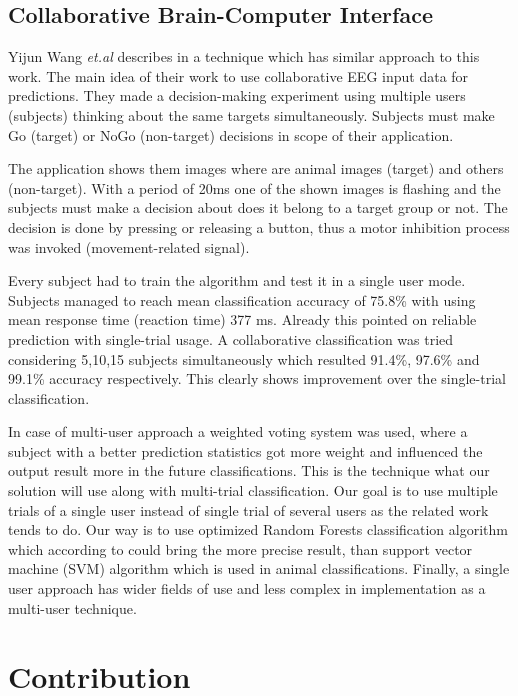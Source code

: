 \documentclass[12pt]{article}
\begin{document}
\subsection{Collaborative Brain-Computer Interface}

Yijun Wang {\it et.al} describes in \cite{collaborative_wang} a technique which has similar approach to this work. The main idea of their work to use collaborative EEG input data for predictions. They made a decision-making experiment using multiple users (subjects) thinking about the same targets simultaneously. Subjects must make Go (target) or NoGo (non-target) decisions in scope of their application. 

The application shows them images where are animal images (target) and others (non-target). With a period of 20ms one of the shown images is flashing and the subjects must make a decision about does it belong to a target group or not. The decision is done by pressing or releasing a button, thus a motor inhibition process was invoked (movement-related signal). 

Every subject had to train the algorithm and test it in a single user mode. Subjects managed to reach mean classification accuracy of 75.8\% with using mean response time (reaction time) 377 ms. Already this pointed on reliable prediction with single-trial usage. A collaborative classification was tried considering 5,10,15 subjects simultaneously which resulted 91.4\%, 97.6\% and 99.1\% accuracy respectively. This clearly shows improvement over the single-trial classification. 

In case of multi-user approach a weighted voting system was used, where a subject with a better prediction statistics got more weight and influenced the output result more in the future classifications. This is the technique what our solution will use along with multi-trial classification. Our goal is to use multiple trials of a single user instead of single trial of several users as the related work tends to do. Our way is to use optimized Random Forests classification algorithm which according to \cite{masso} could bring the more precise result, than support vector machine (SVM) algorithm which is used in animal classifications. Finally, a single user approach has wider fields of use and less complex in implementation as a multi-user technique.

\newpage
\section{Contribution}
\end{document}
